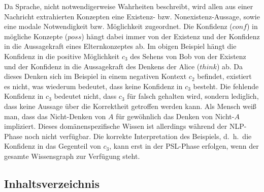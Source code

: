 \documentclass[11pt, a4paper]{scrreprt}
\begin{document}
Da Sprache, nicht notwendigerweise Wahrheiten beschreibt, wird allen aus einer Nachricht extrahierten Konzepten eine Existenz- bzw. Nonexistenz-Aussage, sowie eine modale Notwendigkeit bzw. Möglichkeit zugeordnet.
Die Konfidenz ($conf$) in mögliche Konzepte ($poss$) hängt dabei immer von der Existenz und der Konfidenz in die Aussagekraft eines Elternkonzeptes ab.
Im obigen Beispiel hängt die Konfidenz in die positive Möglichkeit $c_3$ des Sehens von Bob von der Existenz und der Konfidenz in die Aussagekraft des Denkens der Alice ($think$) ab.
Da dieses Denken sich im Beispiel in einem negativen Kontext $c_2$ befindet, existiert es nicht, was wiederum bedeutet, dass keine Konfidenz in $c_3$ besteht.
Die fehlende Konfidenz in $c_3$ bedeutet nicht, dass $c_3$ für falsch gehalten wird, sondern lediglich, dass keine Aussage über die Korrektheit getroffen werden kann.
Als Mensch weiß man, dass das Nicht-Denken von $A$ für gewöhnlich das Denken von Nicht-$A$ impliziert.
Dieses domänenspezifische Wissen ist allerdings während der NLP-Phase noch nicht verfügbar.
Die korrekte Interpretation des Beispiels, d.~h.\ die Konfidenz in das Gegenteil von $c_3$, kann erst in der PSL-Phase erfolgen, wenn der gesamte Wissensgraph zur Verfügung steht.

\pagebreak

\subsection{Inhaltsverzeichnis}
\end{document}
